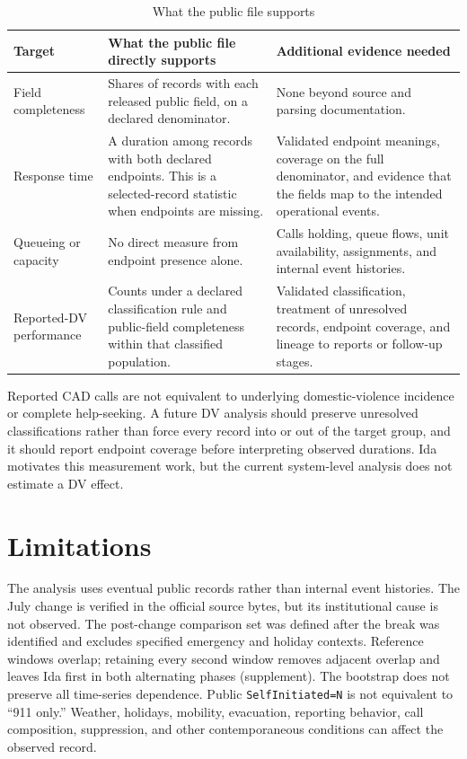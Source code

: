 \documentclass[11pt]{article}
\begin{document}
\begin{table}[!htbp]
\centering
\caption{What the public file supports}
\label{tab:implications}
\begin{tabularx}{\textwidth}{@{}p{}p{}X@{}}
\toprule
Target & What the public file directly supports & Additional evidence needed \\
\midrule
Field completeness &
Shares of records with each released public field, on a declared denominator. &
None beyond source and parsing documentation. \\
Response time &
A duration among records with both declared endpoints. This is a selected-record statistic when endpoints are missing. &
Validated endpoint meanings, coverage on the full denominator, and evidence that the fields map to the intended operational events. \\
Queueing or capacity &
No direct measure from endpoint presence alone. &
Calls holding, queue flows, unit availability, assignments, and internal event histories. \\
Reported-DV performance &
Counts under a declared classification rule and public-field completeness within that classified population. &
Validated classification, treatment of unresolved records, endpoint coverage, and lineage to reports or follow-up stages. \\
\bottomrule
\end{tabularx}
\end{table}

Reported CAD calls are not equivalent to underlying domestic-violence incidence or complete help-seeking. A future DV analysis should preserve unresolved classifications rather than force every record into or out of the target group, and it should report endpoint coverage before interpreting observed durations. Ida motivates this measurement work, but the current system-level analysis does not estimate a DV effect.

\section{Limitations}

The analysis uses eventual public records rather than internal event histories. The July change is verified in the official source bytes, but its institutional cause is not observed. The post-change comparison set was defined after the break was identified and excludes specified emergency and holiday contexts. Reference windows overlap; retaining every second window removes adjacent overlap and leaves Ida first in both alternating phases (supplement). The bootstrap does not preserve all time-series dependence. Public \texttt{SelfInitiated=N} is not equivalent to ``911 only.'' Weather, holidays, mobility, evacuation, reporting behavior, call composition, suppression, and other contemporaneous conditions can affect the observed record.
\end{document}
